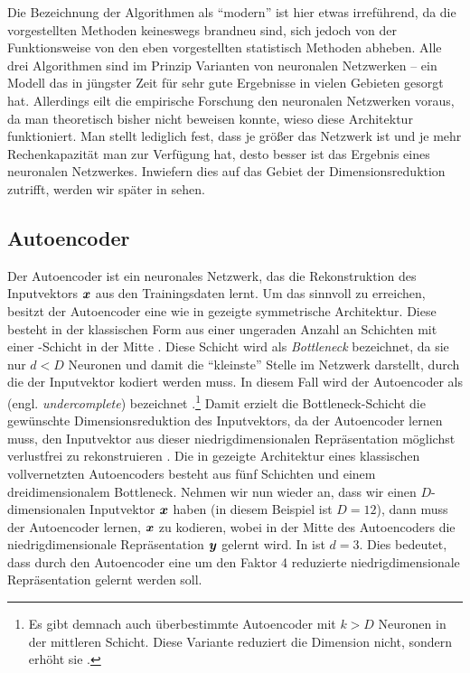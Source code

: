 Die Bezeichnung der Algorithmen als \enquote{modern} ist hier etwas irreführend, da die
vorgestellten Methoden keineswegs brandneu sind, sich jedoch von der Funktionsweise von den eben vorgestellten statistisch Methoden
abheben. Alle drei Algorithmen sind im Prinzip Varianten von neuronalen Netzwerken -- ein Modell
das in jüngster Zeit für sehr gute Ergebnisse in vielen Gebieten gesorgt hat. Allerdings eilt die
empirische Forschung den neuronalen Netzwerken voraus, da man theoretisch bisher nicht beweisen
konnte, wieso diese Architektur funktioniert. Man stellt lediglich fest, dass je größer das
Netzwerk ist und je mehr Rechenkapazität man zur Verfügung hat, desto besser ist das Ergebnis eines
neuronalen Netzwerkes\addref. Inwiefern dies auf das Gebiet der Dimensionsreduktion zutrifft,
werden wir später in  sehen.

\subsection{Autoencoder}
\label{ch:MethodenDerDimRed:ML:AE}

Der Autoencoder ist ein neuronales Netzwerk, das die Rekonstruktion des Inputvektors $\bm{x}$ aus
den Trainingsdaten lernt. Um das sinnvoll zu erreichen, besitzt der Autoencoder eine wie in
 gezeigte symmetrische Architektur. Diese besteht in der
klassischen Form aus einer ungeraden Anzahl an Schichten mit einer -Schicht in
der Mitte \parencite[2]{Bank.2020}. Diese Schicht wird als \textit{Bottleneck} bezeichnet, da sie nur $d < D$
Neuronen und damit die \enquote{kleinste} Stelle im Netzwerk darstellt, durch die der Inputvektor
kodiert werden muss. In diesem Fall wird der Autoencoder als  (engl.
\textit{undercomplete}) bezeichnet \parencite[503]{Goodfellow.2016}.\footnote{Es gibt demnach auch überbestimmte Autoencoder mit $k > D$
	Neuronen in der mittleren Schicht. Diese Variante reduziert die Dimension nicht, sondern erhöht sie \parencite[504]{Goodfellow.2016}.} Damit erzielt die Bottleneck-Schicht die gewünschte
Dimensionsreduktion des Inputvektors, da der Autoencoder lernen muss, den Inputvektor aus dieser
niedrigdimensionalen Repräsentation möglichst verlustfrei zu rekonstruieren \parencites[502]{Goodfellow.2016}[2]{Bank.2020}. Die in  gezeigte
Architektur eines klassischen vollvernetzten Autoencoders besteht aus fünf Schichten und einem
dreidimensionalem Bottleneck. Nehmen wir nun wieder an, dass wir einen $D$-dimensionalen
Inputvektor $\bm{x}$ haben (in diesem Beispiel ist $D = 12$), dann muss der Autoencoder lernen,
$\bm{x}$ zu kodieren, wobei in der Mitte des Autoencoders die niedrigdimensionale Repräsentation
$\bm{y}$ gelernt wird. In  ist $d = 3$. Dies bedeutet, dass
durch den Autoencoder eine um den Faktor 4 reduzierte niedrigdimensionale Repräsentation gelernt
werden soll.


